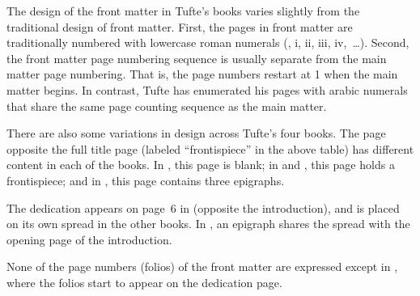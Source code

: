 \bigskip
The design of the front matter in Tufte's books varies slightly from the
traditional design of front matter.  First, the pages in front matter are
traditionally numbered with lowercase roman numerals (\eg, i, ii, iii,
iv,~\ldots).  Second, the front matter page numbering sequence is usually
separate from the main matter page numbering.  That is, the page numbers
restart at 1 when the main matter begins.  In contrast, Tufte has
enumerated his pages with arabic numerals that share the same page counting
sequence as the main matter.  

There are also some variations in design across Tufte's four books.  The
page opposite the full title page (labeled ``frontispiece'' in the above
table) has different content in each of the books.  In \VDQI, this page is
blank; in \EI and \VE, this page holds a frontispiece; and in \BE, this
page contains three epigraphs.

The dedication appears on page~6 in \vdqi (opposite the introduction), and
is placed on its own spread in the other books.  In \ve, an epigraph shares
the spread with the opening page of the introduction.

None of the page numbers (folios) of the front matter are expressed except in
\be, where the folios start to appear on the dedication page.

\lipsum[2]
\par\endgroup
